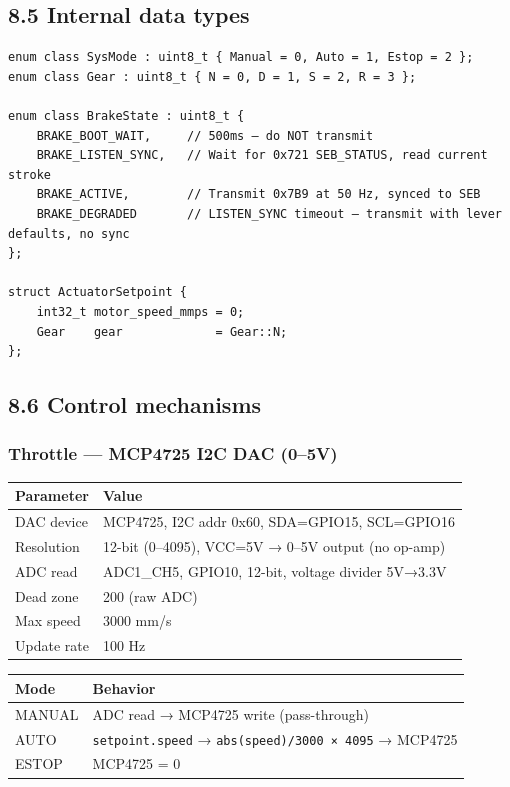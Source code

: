 \subsection{8.5 Internal data types}\label{internal-data-types-1}

\begin{verbatim}
enum class SysMode : uint8_t { Manual = 0, Auto = 1, Estop = 2 };
enum class Gear : uint8_t { N = 0, D = 1, S = 2, R = 3 };

enum class BrakeState : uint8_t {
    BRAKE_BOOT_WAIT,     // 500ms — do NOT transmit
    BRAKE_LISTEN_SYNC,   // Wait for 0x721 SEB_STATUS, read current stroke
    BRAKE_ACTIVE,        // Transmit 0x7B9 at 50 Hz, synced to SEB
    BRAKE_DEGRADED       // LISTEN_SYNC timeout — transmit with lever defaults, no sync
};

struct ActuatorSetpoint {
    int32_t motor_speed_mmps = 0;
    Gear    gear             = Gear::N;
};
\end{verbatim}

\subsection{8.6 Control mechanisms}\label{control-mechanisms-1}

\subsubsection{Throttle --- MCP4725 I2C DAC
(0--5V)}\label{throttle-mcp4725-i2c-dac-05v}

\begin{longtable}[]{@{}ll@{}}
\toprule\noalign{}
Parameter & Value \\
\midrule\noalign{}
\endhead
\bottomrule\noalign{}
\endlastfoot
DAC device & MCP4725, I2C addr 0x60, SDA=GPIO15, SCL=GPIO16 \\
Resolution & 12-bit (0--4095), VCC=5V → 0--5V output (no op-amp) \\
ADC read & ADC1\_CH5, GPIO10, 12-bit, voltage divider 5V→3.3V \\
Dead zone & 200 (raw ADC) \\
Max speed & 3000 mm/s \\
Update rate & 100 Hz \\
\end{longtable}

\begin{longtable}[]{@{}ll@{}}
\toprule\noalign{}
Mode & Behavior \\
\midrule\noalign{}
\endhead
\bottomrule\noalign{}
\endlastfoot
MANUAL & ADC read → MCP4725 write (pass-through) \\
AUTO & \texttt{setpoint.speed} → \texttt{abs(speed)/3000\ ×\ 4095} → MCP4725 \\
ESTOP & MCP4725 = 0 \\
\end{longtable}

